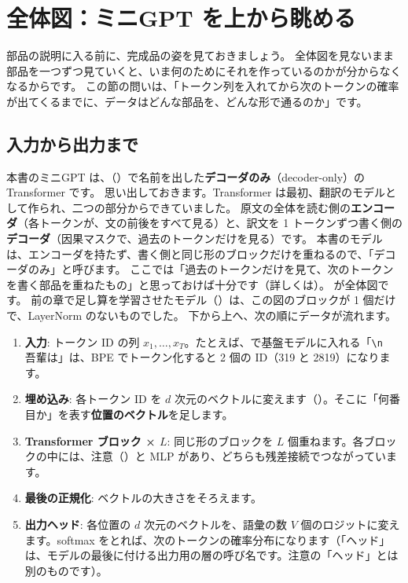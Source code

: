 \section{全体図：ミニGPT を上から眺める}\label{sec:tf-overview}

部品の説明に入る前に、完成品の姿を見ておきましょう。
全体図を見ないまま部品を一つずつ見ていくと、いま何のためにそれを作っているのかが分からなくなるからです。
この節の問いは、「トークン列を入れてから次のトークンの確率が出てくるまでに、データはどんな部品を、どんな形で通るのか」です。

\subsection*{入力から出力まで}

本書のミニGPT は、（）で名前を出した\textbf{デコーダのみ}（decoder-only）の Transformer です。
思い出しておきます。Transformer は最初、翻訳のモデルとして作られ、二つの部分からできていました。
原文の全体を読む側の\textbf{エンコーダ}（各トークンが、文の前後をすべて見る）と、訳文を 1 トークンずつ書く側の\textbf{デコーダ}（因果マスクで、過去のトークンだけを見る）です。
本書のモデルは、エンコーダを持たず、書く側と同じ形のブロックだけを重ねるので、「デコーダのみ」と呼びます。
ここでは「過去のトークンだけを見て、次のトークンを書く部品を重ねたもの」と思っておけば十分です（詳しくは）。
が全体図です。
前の章で足し算を学習させたモデル（）は、この図のブロックが 1 個だけで、LayerNorm のないものでした。
下から上へ、次の順にデータが流れます。

\begin{enumerate}
\item \textbf{入力}: トークン ID の列 $x_1,\dots,x_T$。たとえば、で基盤モデルに入れる「\texttt{\textbackslash n}　吾輩は」は、BPE でトークン化すると 2 個の ID（319 と 2819）になります。
\item \textbf{埋め込み}: 各トークン ID を $d$ 次元のベクトルに変えます（）。そこに「何番目か」を表す\textbf{位置のベクトル}を足します。
\item \textbf{Transformer ブロック × $L$}: 同じ形のブロックを $L$ 個重ねます。各ブロックの中には、注意（）と MLP があり、どちらも残差接続でつながっています。
\item \textbf{最後の正規化}: ベクトルの大きさをそろえます。
\item \textbf{出力ヘッド}: 各位置の $d$ 次元のベクトルを、語彙の数 $V$ 個のロジットに変えます。softmax をとれば、次のトークンの確率分布になります（「ヘッド」は、モデルの最後に付ける出力用の層の呼び名です。注意の「ヘッド」とは別のものです）。
\end{enumerate}

